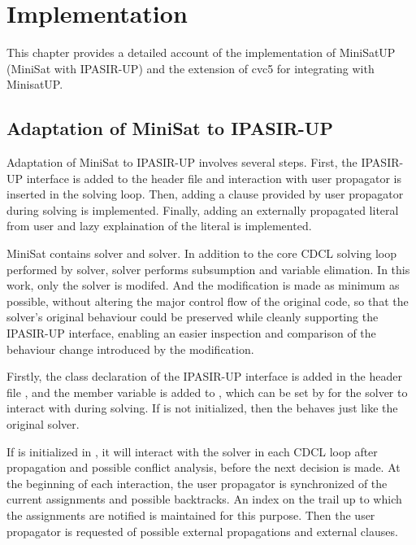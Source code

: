 \chapter{Implementation}

This chapter provides a detailed account of the implementation of MiniSatUP (MiniSat with IPASIR-UP) and the extension of cvc5 for integrating with MinisatUP.

\section{Adaptation of MiniSat to IPASIR-UP}

Adaptation of MiniSat to IPASIR-UP involves several steps. First, the IPASIR-UP interface is added to the header file and interaction with user propagator is inserted in the solving loop. Then, adding a clause provided by user propagator during solving is implemented. Finally, adding an externally propagated literal from user and lazy explaination of the literal is implemented.

MiniSat contains  solver and  solver. In addition to the core CDCL solving loop performed by  solver,  solver performs subsumption and variable elimation. In this work, only the  solver is modifed. And the modification is made as minimum as possible, without altering the major control flow of the original code, so that the solver's original behaviour could be preserved while cleanly supporting the IPASIR-UP interface, enabling an easier inspection and comparison of the behaviour change introduced by the modification.


Firstly, the  class declaration of the IPASIR-UP interface is added in the header file , and the  member variable is added to , which can be set by  for the solver to interact with during solving. If  is not initialized, then the  behaves just like the original solver.

If  is initialized in , it will interact with the solver in each CDCL loop after propagation and possible conflict analysis, before the next decision is made. At the beginning of each interaction, the user propagator is synchronized of the current assignments and possible backtracks. An index on the trail up to which the assignments are notified is maintained for this purpose. Then the user propagator is requested of possible external propagations and external clauses.

